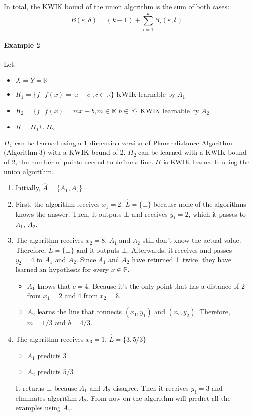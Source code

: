In total, the KWIK bound of the union algorithm is the sum of both cases:
$$ B(\varepsilon, \delta) = (k - 1) + \sum_{i = 1}^k B_i(\varepsilon, \delta) $$


\paragraph{Example 2}
Let:
\begin{itemize}
  \item $X = Y = \mathbb{R}$
  \item $H_1 = \{ f \ | \ f(x) =|x - c|, c \in \mathbb{R} \}$ KWIK learnable by $A_1$
  \item $H_2 = \{ f \ | \ f(x) = mx + b, m \in \mathbb{R}, b \in \mathbb{R} \}$ KWIK learnable by $A_2$
  \item $H = H_1 \cup H_2$
\end{itemize}

$H_1$ can be learned using a 1 dimension version of Planar-distance Algorithm (Algorithm 3) with a
KWIK bound of 2. $H_2$ can be learned with a KWIK bound of $2$,
the number of points needed to define a line.
$H$ is KWIK learnable using the union algorithm.
\begin{enumerate}
  \item Initially, $\hat{A} = \{A_1, A_2 \}$
  \item First, the algorithm receives $x_1 = 2$. $\hat{L} = \{ \bot \}$ because none of the algorithms knows the answer. Then, it outputs $\bot$ and receives $y_1 = 2$, which it passes to $A_1$, $A_2$.
  \item The algorithm receives $x_2 = 8$. $A_1$ and $A_2$ still don't know the actual value. Therefore, $\hat{L} = \{ \bot \}$ and it outputs $\bot$. Afterwards, it receives and passes $y_2 = 4$ to $A_1$ and $A_2$.
    Since $A_1$ and $A_2$ have returned $\bot$ twice, they have learned an hypothesis for every $x \in \mathbb{R}$.
    \begin{itemize}
      \item $A_1$ knows that $c = 4$. Because it's the only point that has a distance of $2$ from $x_1=2$ and 4 from $x_2 = 8$.
      \item $A_2$ learns the line that connects $(x_1, y_1)$ and $(x_2, y_2)$. Therefore, $m = 1/3$ and $b = 4/3$.
    \end{itemize}
  \item The algorithm receives $x_3 = 1$. $\hat{L} = \{ 3, 5/3 \}$
    \begin{itemize}
      \item $A_1$ predicts $3$
      \item $A_2$ predicts $5/3$
    \end{itemize}
    It returns $\bot$ because $A_1$ and $A_2$ disagree. Then it receives $y_3 = 3$ and eliminates algorithm $A_2$.
    From now on the algorithm will predict all the examples using $A_1$.
\end{enumerate}

